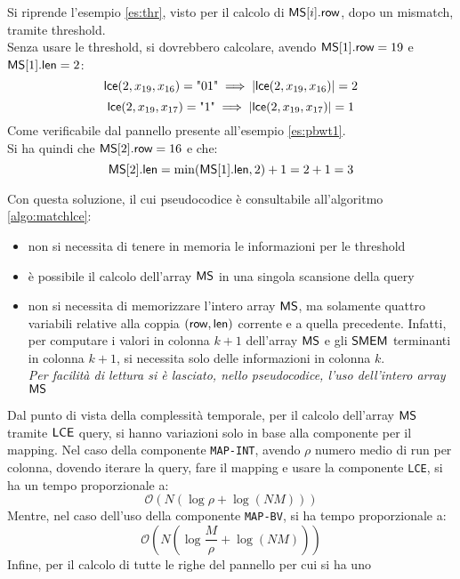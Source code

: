\begin{esempio}
  Si riprende l'esempio \ref{es:thr}, visto per il calcolo di $\mbox{\rm {\sf MS}}[i].\mbox{\rm {\sf row}}$,
  dopo un mismatch, tramite threshold. \\
  Senza usare le threshold, si dovrebbero
  calcolare, avendo $\mbox{\rm {\sf MS}}[1].\mbox{\rm {\sf row}}=19$ e $\mbox{\rm {\sf MS}}[1].\mbox{\rm {\sf len}} =2$:
  \[\mbox{\rm {\sf lce}}(2, x_{19}, x_{16}) = \mbox{"01"} \implies|\mbox{\rm {\sf lce}}(2, x_{19}, x_{16})|=2\]
  \[\mbox{\rm {\sf lce}}(2, x_{19}, x_{17}) = \mbox{"1"} \implies|\mbox{\rm {\sf lce}}(2, x_{19}, x_{17})|=1\]
  Come verificabile dal pannello presente all'esempio \ref{es:pbwt1}.\\
  Si ha quindi che $\mbox{\rm {\sf MS}}[2].\mbox{\rm {\sf row}}=16$ e che:
  \[\mbox{\rm {\sf MS}}[2].\mbox{\rm {\sf len}}=\min(\mbox{\rm {\sf MS}}[1].\mbox{\rm {\sf len}}, 2)+1=2+1=3\]
\end{esempio}
\noindent
Con questa soluzione, il cui pseudocodice è consultabile all'algoritmo
\ref{algo:matchlce}: 
\begin{itemize}
  \item non si necessita di tenere in memoria le informazioni per le
  threshold
  \item è possibile il calcolo dell'array $\mbox{\rm {\sf MS}}$ in una singola scansione della
  query
  \item non si necessita di memorizzare l'intero array $\mbox{\rm {\sf MS}}$, ma solamente
  quattro variabili relative alla coppia
  $(\mbox{\rm {\sf row}},\mbox{\rm {\sf len}})$ corrente e a quella precedente. Infatti, per computare i valori
  in 
  colonna $k+1$ dell'array $\mbox{\rm {\sf MS}}$ e gli $\mbox{\rm {\sf SMEM}}$ terminanti in colonna $k+1$, si
  necessita solo delle informazioni in colonna $k$. \\
  \textit{Per facilità di
    lettura si è lasciato, nello pseudocodice, l'uso dell'intero array $\mbox{\rm {\sf MS}}$}
\end{itemize}
Dal punto di vista della complessità temporale, per il calcolo dell'array $\mbox{\rm {\sf MS}}$
tramite $\mbox{\rm {\sf LCE}}$ query, si hanno variazioni solo in base alla componente per il
mapping.  
Nel caso della componente \texttt{MAP-INT}, avendo $\rho$ numero medio di run
per colonna, dovendo iterare la query, fare il mapping e usare la
componente \texttt{LCE}, si 
ha un tempo proporzionale a: 
\begin{equation}
  \label{eq:mslce22}
  \mathcal{O}(N(\log \rho+\log (\mathit{NM})))
\end{equation}
Mentre, nel caso dell'uso della componente \texttt{MAP-BV}, si ha tempo
proporzionale a:
\begin{equation}
  \label{eq:mslce3}
  \mathcal{O}\left(N\left(\log \frac{M}{\rho}+\log (\mathit{NM})\right)\right)
\end{equation}
Infine, per il calcolo di tutte le righe del pannello per cui si ha uno
